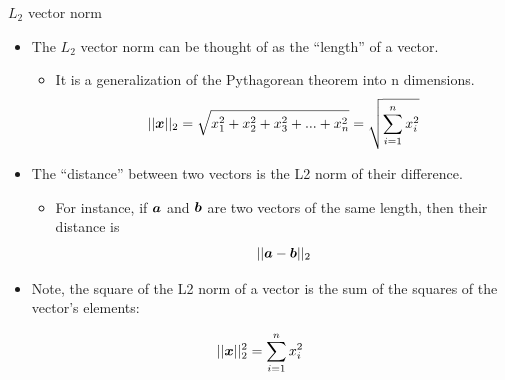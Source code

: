 \documentclass[aspectratio=169]{../latex_main/tntbeamer}  %
\begin{document}
	
	\begin{frame}{$L_2$ vector norm}
	    \begin{itemize}
	        \item The $L_2$ vector norm can be thought of as the “length” of a vector.
	        \begin{itemize}
	            \item It is a generalization of the Pythagorean theorem into n dimensions.
	            \begin{equation*}
	                    ||\bm{x}||_2 = \sqrt{x_1^2 + x_2^2 + x_3^2 + ... + x_n^2} = \sqrt{\sum\limits_{i=1}^nx_i^2}
	             \end{equation*}
	        \end{itemize}
	        \item  The “distance” between two vectors is the L2 norm of their difference.
	        \begin{itemize}
	            \item For instance, if $\bm{a}$ and $\bm{b}$ are two vectors of the same length, then their distance is
                \begin{equation*}
                    ||\bm{a}-\bm{b}||_2
                \end{equation*}
	        \end{itemize}
	        \item Note, the square of the L2 norm of a vector is the sum of the squares of the vector’s elements:
	    \end{itemize}
	    \begin{equation*}
                    ||\bm{x}||_2^2 = \sum\limits_{i=1}^nx_i^2
        \end{equation*}
	\end{frame}
	
	
	
\end{document}
